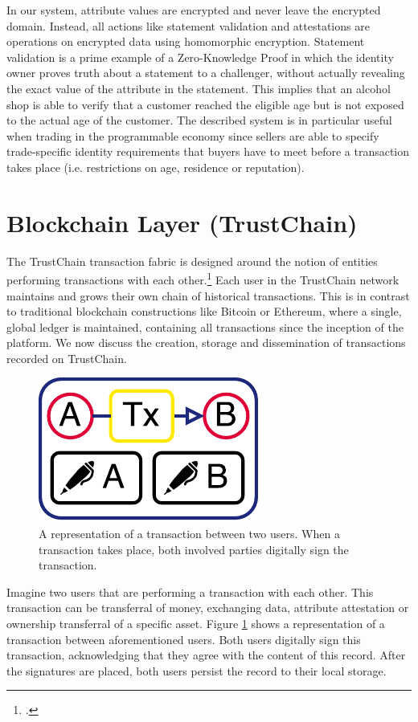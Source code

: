 \documentclass[USenglish]{article}
\begin{document}
In our system, attribute values are encrypted and never leave the encrypted domain.
Instead, all actions like statement validation and attestations are operations on encrypted data using homomorphic encryption.
Statement validation is a prime example of a Zero-Knowledge Proof in which the identity owner proves truth about a statement to a challenger, without actually revealing the exact value of the attribute in the statement.
This implies that an alcohol shop is able to verify that a customer reached the eligible age but is not exposed to the actual age of the customer.
The described system is in particular useful when trading in the programmable economy since sellers are able to specify trade-specific identity requirements that buyers have to meet before a transaction takes place (i.e. restrictions on age, residence or reputation).

\section{Blockchain Layer (TrustChain)}
\label{sec:trustchain}
The TrustChain transaction fabric is designed around the notion of entities performing transactions with each other.\footcite{otte2017trustchain}
Each user in the TrustChain network maintains and grows their own chain of historical transactions. 
This is in contrast to traditional blockchain constructions like Bitcoin or Ethereum, where a single, global ledger is maintained, containing all transactions since the inception of the platform.
We now discuss the creation, storage and dissemination of transactions recorded on TrustChain.

\begin{figure}[h!]
	\centering
	\includegraphics[width=0.3\columnwidth]{assets/trustchain_tutorial_1}
	\caption{A representation of a transaction between two users. When a transaction takes place, both involved parties digitally sign the transaction.}
	\label{fig:trustchain_tutorial_1}
\end{figure}

Imagine two users that are performing a transaction with each other.
This transaction can be transferral of money, exchanging data, attribute attestation or ownership transferral of a specific asset.
Figure \ref{fig:trustchain_tutorial_1} shows a representation of a transaction between aforementioned users.
Both users digitally sign this transaction, acknowledging that they agree with the content of this record.
After the signatures are placed, both users persist the record to their local storage.
\end{document}
